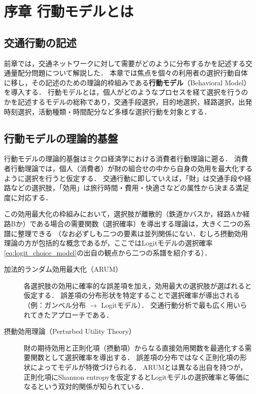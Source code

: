 
\section*{序章 行動モデルとは}

\subsection*{交通行動の記述}

前章では，交通ネットワークに対して需要がどのように分布するかを記述する交通量配分問題について解説した．
本章では焦点を個々の利用者の選択行動自体に移し，その記述のための理論的枠組みである\textbf{行動モデル}（Behavioral Model）を導入する．
行動モデルとは，個人がどのようなプロセスを経て選択を行うのかを記述するモデルの総称であり，交通手段選択，目的地選択，経路選択，出発時刻選択，活動種類・時間配分など多様な選択行動を対象とする．

\subsection*{行動モデルの理論的基盤}

行動モデルの理論的基盤はミクロ経済学における消費者行動理論に遡る．
消費者行動理論では，個人（消費者）が財の組合せの中から自身の効用を最大化するように選択を行うと仮定する．
交通行動に即していえば，「財」は交通手段や経路などの選択肢，「効用」は旅行時間・費用・快適さなどの属性から決まる満足度に対応する．

この効用最大化の枠組みにおいて，選択肢が離散的（鉄道かバスか，経路Aか経路Bか）である場合の需要関数（選択確率）を導出する理論は，大きく二つの系譜に整理できる
（なお必ずしも二つの要素は並列関係にない．むしろ摂動効用理論の方が包括的な概念であるが，ここではLogitモデルの選択確率\eqref{eq:logit_choice_model}の出自の観点から二つの系譜を紹介する）．

\begin{description}
  \item[加法的ランダム効用最大化（ARUM）]
    各選択肢の効用に確率的な誤差項を加え，効用最大の選択肢が選ばれると仮定する．
    誤差項の分布形状を特定することで選択確率が導出される（例：ガンベル分布 $\to$ Logitモデル）．
    交通行動分析で最も広く用いられてきたアプローチである．

  \item[摂動効用理論（Perturbed Utility Theory）]
    財の期待効用と正則化項（摂動項）からなる直接効用関数を最適化する需要関数として選択確率を導出する．
    誤差項の分布ではなく正則化項の形状によってモデルが特徴づけられる．
    ARUMとは異なる出自を持つが，正則化項にShannon entropyを仮定するとLogitモデルの選択確率と等価になるという双対的関係が知られている．
\end{description}

